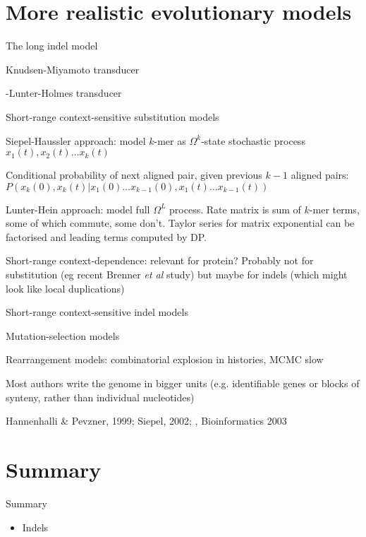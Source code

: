\documentclass{beamer}
\begin{document}
\section{More realistic evolutionary models}

\begin{frame}{}

\itemb
\item The long indel model
 \itemb
 \item Knudsen-Miyamoto transducer
 \item \Miklos-Lunter-Holmes transducer
 \iteme
\item Short-range context-sensitive substitution models
 \itemb
 \item Siepel-Haussler approach: model $k$-mer as $\Omega^k$-state stochastic process $x_1(t), x_2(t) \ldots x_k(t)$
  \itemb
  \item Conditional probability of next aligned pair, given previous $k-1$ aligned pairs:
$P(x_k(0),x_k(t)|x_1(0) \ldots x_{k-1}(0),x_1(t) \ldots x_{k-1}(t))$
  \iteme
 \item Lunter-Hein approach: model full $\Omega^L$ process.
Rate matrix is sum of $k$-mer terms, some of which commute, some don't.
Taylor series for matrix exponential can be factorised and leading terms computed by DP.
 \item Short-range context-dependence: relevant for protein?
Probably not for substitution (eg recent Brenner {\em et al} study)
but maybe for indels (which might look like local duplications)
 \iteme
\iteme
\end{frame}

\begin{frame}{}
\itemb
\item Short-range context-sensitive indel models
\item Mutation-selection models
\item Rearrangement models: combinatorial explosion in histories, MCMC slow
 \itemb
 \item Most authors write the genome in bigger units (e.g. identifiable genes or blocks of synteny, rather than individual nucleotides)
 \item Hannenhalli \& Pevzner, 1999; Siepel, 2002; \Miklos, Bioinformatics 2003
 \iteme
\iteme

\end{frame}




\section*{Summary}

\begin{frame}{Summary}

  \begin{itemize}
  \item Indels
  \end{itemize}

\end{frame}
\end{document}
